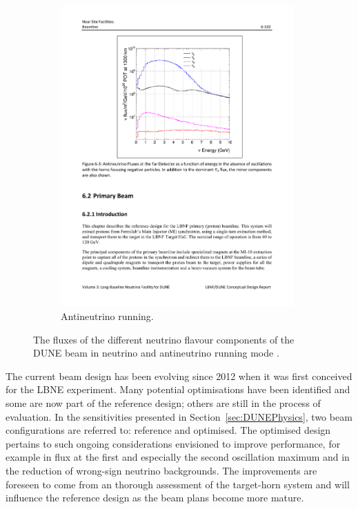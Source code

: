 \begin{figure}
\begin{subfigure}[t]{0.48\linewidth}
    \includegraphics[width=0.98\textwidth]{DUNEBeamFluxesAntiNeutrino.pdf}
    \caption{Antineutrino running.}
    \label{fig:DUNEBeamFluxesAntiNeutrino}
  \end{subfigure}
  \caption[The fluxes of the different neutrino flavour components of the DUNE beam in neutrino and antineutrino running mode.]{The fluxes of the different neutrino flavour components of the DUNE beam in neutrino and antineutrino running mode \cite{DUNECDR3}.}
  \label{fig:DUNEBeamFluxes}
\end{figure}

The current beam design has been evolving since 2012 when it was first conceived for the LBNE experiment.  Many potential optimisations have been identified and some are now part of the reference design; others are still in the process of evaluation.  In the sensitivities presented in Section~\ref{sec:DUNEPhysics}, two beam configurations are referred to: reference and optimised.  The optimised design pertains to such ongoing considerations envisioned to improve performance, for example in flux at the first and especially the second oscillation maximum and in the reduction of wrong-sign neutrino backgrounds.  The improvements are foreseen to come from an thorough assessment of the target-horn system and will influence the reference design as the beam plans become more mature.

